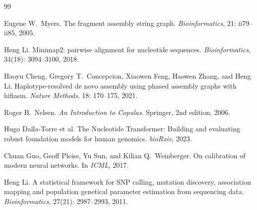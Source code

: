 \documentclass[11pt]{article}
\begin{document}

\begin{thebibliography}{99}

Eugene W.\ Myers.
\newblock The fragment assembly string graph.
\newblock \emph{Bioinformatics}, 21: ii79--ii85, 2005.

Heng Li.
\newblock Minimap2: pairwise alignment for nucleotide sequences.
\newblock \emph{Bioinformatics}, 34(18): 3094--3100, 2018.

Haoyu Cheng, Gregory T.\ Concepcion, Xiaowen Feng, Haowen Zhang, and Heng Li.
\newblock Haplotype-resolved de novo assembly using phased assembly graphs
  with hifiasm.
\newblock \emph{Nature Methods}, 18: 170--175, 2021.

Roger B.\ Nelsen.
\newblock \emph{An Introduction to Copulas}.
\newblock Springer, 2nd edition, 2006.

Hugo Dalla-Torre et al.
\newblock The Nucleotide Transformer: Building and evaluating robust
  foundation models for human genomics.
\newblock \emph{bioRxiv}, 2023.

Chuan Guo, Geoff Pleiss, Yu Sun, and Kilian Q.\ Weinberger.
\newblock On calibration of modern neural networks.
\newblock In \emph{ICML}, 2017.

Heng Li.
\newblock A statistical framework for SNP calling, mutation discovery,
  association mapping and population genetical parameter estimation from
  sequencing data.
\newblock \emph{Bioinformatics}, 27(21): 2987--2993, 2011.

\end{thebibliography}
\end{document}
